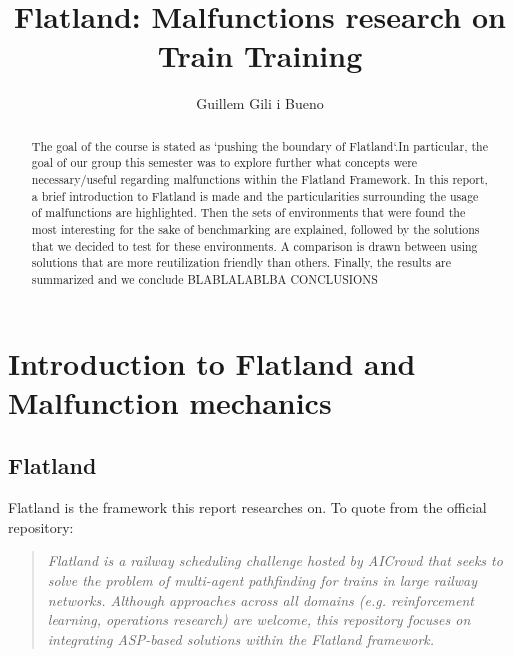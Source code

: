 \documentclass[runningheads]{llncs}
\begin{document}
%
\title{Flatland: Malfunctions research on Train Training}

%
%
\author{Guillem Gili i Bueno}
%
%
\maketitle              %




%
\begin{abstract}
The goal of the course is stated as `pushing the boundary of Flatland`.In particular, the goal of our group this semester was to explore further what concepts were necessary/useful regarding malfunctions within the Flatland Framework. In this report, a brief introduction to Flatland is made and the particularities surrounding the usage of malfunctions are highlighted. Then the sets of environments that were found the most interesting for the sake of benchmarking are explained, followed by the solutions that we decided to test for these environments. A comparison is drawn between using solutions that are more reutilization friendly than others. Finally, the results are summarized and  we conclude BLABLALABLBA CONCLUSIONS




\end{abstract}
%
%
%
\setcounter{tocdepth}{4}

\tableofcontents


\section{Introduction to Flatland and Malfunction mechanics}
\subsection{Flatland}

Flatland\cite{flatland} is the framework this report researches on. To quote from the official repository:
\begin{quote}
\emph{	Flatland is a railway scheduling challenge hosted by AICrowd that seeks to solve the problem of multi-agent pathfinding for trains in large railway networks. Although approaches across all domains (e.g. reinforcement learning, operations research) are welcome, this repository focuses on integrating ASP-based solutions within the Flatland framework.}
\end{quote}
\end{document}
